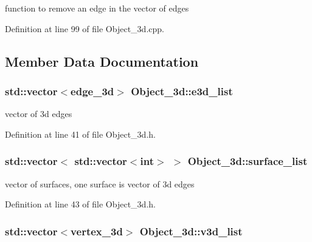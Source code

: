 function to remove an edge in the vector of edges 



Definition at line 99 of file Object\+\_\+3d.\+cpp.



\subsection{Member Data Documentation}
\subsubsection[{\texorpdfstring{e3d\+\_\+list}{e3d_list}}]{\setlength{\rightskip}{0pt plus 5cm}std\+::vector$<${\bf edge\+\_\+3d}$>$ Object\+\_\+3d\+::e3d\+\_\+list}\hypertarget{class_object__3d_a678f396b3aa4a3c0958ec0c7b7f36e89}{}\label{class_object__3d_a678f396b3aa4a3c0958ec0c7b7f36e89}


vector of 3d edges 



Definition at line 41 of file Object\+\_\+3d.\+h.

\subsubsection[{\texorpdfstring{surface\+\_\+list}{surface_list}}]{\setlength{\rightskip}{0pt plus 5cm}std\+::vector$<$ std\+::vector$<$int$>$ $>$ Object\+\_\+3d\+::surface\+\_\+list}\hypertarget{class_object__3d_a979ba92cf69caa653b89cf75fd278afe}{}\label{class_object__3d_a979ba92cf69caa653b89cf75fd278afe}
vector of surfaces, one surface is vector of 3d edges 

Definition at line 43 of file Object\+\_\+3d.\+h.

\subsubsection[{\texorpdfstring{v3d\+\_\+list}{v3d_list}}]{\setlength{\rightskip}{0pt plus 5cm}std\+::vector$<${\bf vertex\+\_\+3d}$>$ Object\+\_\+3d\+::v3d\+\_\+list}\hypertarget{class_object__3d_a7817c087a9d1bb4f0e077e2b070e9596}{}\label{class_object__3d_a7817c087a9d1bb4f0e077e2b070e9596}


